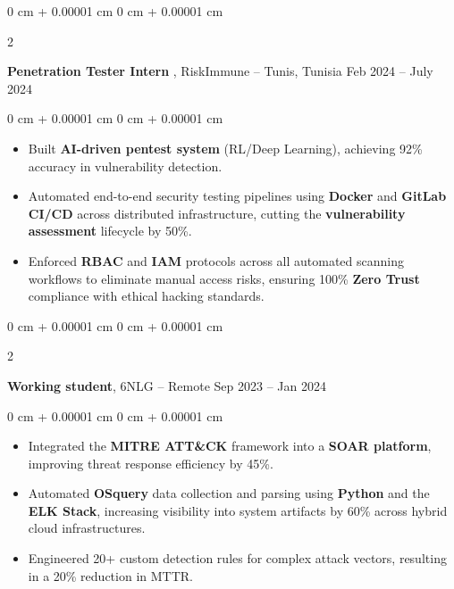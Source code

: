 \documentclass[10pt, letterpaper]{article}
\newenvironment{highlights}{
    \begin{itemize}[
        topsep=0.10 cm,
        parsep=0.10 cm,
        partopsep=0pt,
        itemsep=0pt,
        leftmargin=0 cm + 10pt
    ]
}{
    \end{itemize}
} %
\newenvironment{onecolentry}{
    \begin{adjustwidth}{
        0 cm + 0.00001 cm
    }{
        0 cm + 0.00001 cm
    }
}{
    \end{adjustwidth}
} %
\newenvironment{twocolentry}[2][]{
    \onecolentry
    \def\secondColumn{#2}
    \setcolumnwidth{\fill, 4.5 cm}
    \begin{paracol}{2}
}{
    \switchcolumn \raggedleft \secondColumn
    \end{paracol}
    \endonecolentry
} %
\begin{document}
         \vspace{0.2 cm}


        \begin{twocolentry}{
            Feb 2024 – July 2024
        }
            \textbf{Penetration Tester Intern }, RiskImmune -- Tunis, Tunisia\end{twocolentry}

        \vspace{0.10 cm}
        \begin{onecolentry}
            \begin{highlights}
                \item  Built \textbf{AI-driven pentest system} (RL/Deep Learning), achieving 92\% accuracy in vulnerability detection.
                \item Automated end-to-end security testing pipelines using \textbf{Docker} and \textbf{GitLab CI/CD} across distributed infrastructure, cutting the \textbf{vulnerability assessment} lifecycle by 50\%.
                \item Enforced \textbf{RBAC} and \textbf{IAM} protocols across all automated scanning workflows to eliminate manual access risks, ensuring 100\% \textbf{Zero Trust} compliance with ethical hacking standards.
            \end{highlights}
        \end{onecolentry}


        \vspace{0.2 cm}


        \begin{twocolentry}{
            Sep 2023 – Jan 2024
        }
            \textbf{Working student}, 6NLG -- Remote \end{twocolentry}

        \vspace{0.10 cm}
        \begin{onecolentry}
            \begin{highlights}
                \item Integrated the\textbf{ MITRE ATT\&CK} framework into a \textbf{SOAR platform}, improving threat response efficiency by 45\%.
                \item Automated \textbf{OSquery} data collection and parsing using \textbf{Python} and the \textbf{ELK Stack}, increasing visibility into system artifacts by 60\% across hybrid cloud infrastructures.
                \item Engineered 20+ custom detection rules for complex attack vectors, resulting in a 20\% reduction in MTTR.

                \end{highlights}
        \end{onecolentry}
\end{document}

